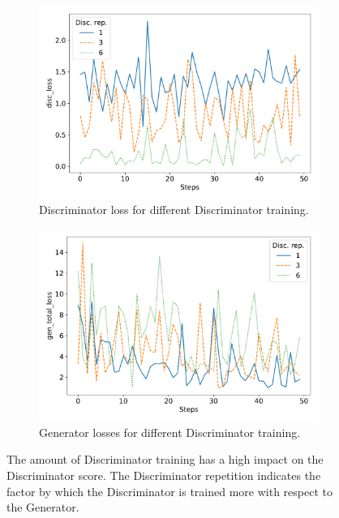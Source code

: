 \begin{figure}
	\centering
	\begin{subfigure}{0.5\linewidth}
		\centering
		\includegraphics[width=\textwidth]{fig/analysis/Plot_Disc_rep_disc_loss.pdf}
		\caption{Discriminator loss for different Discriminator training.}
		\label{fig:Plot_discrep_discloss}
	\end{subfigure}\hfill
	\begin{subfigure}{0.5\linewidth}
		\centering
		\includegraphics[width=\textwidth]{fig/analysis/Plot_Disc_rep_gen_total_loss.pdf}
		\caption{Generator losses for different Discriminator training.}
		\label{fig:Plot_discrep_genloss}
	\end{subfigure}\hfill
	\caption{The amount of Discriminator training has a high impact on the Discriminator score. The Discriminator repetition indicates the factor by which the Discriminator is trained more with respect to the Generator.}
	\label{fig:Plot_discrep_loss}
\end{figure}
